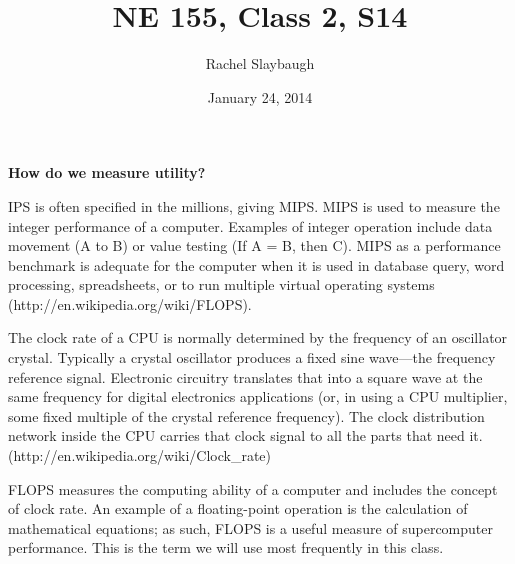 \documentclass[12pt]{article}
\title{NE 155, Class 2, S14}
\author{Rachel Slaybaugh}
\date{January 24, 2014}
\begin{document}
\maketitle

\noident \textbf{How do we measure utility?}

IPS is often specified in the millions, giving MIPS. MIPS is used to measure the integer performance of a computer. Examples of integer operation include data movement (A to B) or value testing (If A = B, then C). MIPS as a performance benchmark is adequate for the computer when it is used in database query, word processing, spreadsheets, or to run multiple virtual operating systems (http://en.wikipedia.org/wiki/FLOPS).

The clock rate of a CPU is normally determined by the frequency of an oscillator crystal. Typically a crystal oscillator produces a fixed sine wave—the frequency reference signal. Electronic circuitry translates that into a square wave at the same frequency for digital electronics applications (or, in using a CPU multiplier, some fixed multiple of the crystal reference frequency). The clock distribution network inside the CPU carries that clock signal to all the parts that need it. (http://en.wikipedia.org/wiki/Clock_rate)

FLOPS measures the computing ability of a computer and includes the concept of clock rate. An example of a floating-point operation is the calculation of mathematical equations; as such, FLOPS is a useful measure of supercomputer performance. This is the term we will use most frequently in this class. 
\end{document}
